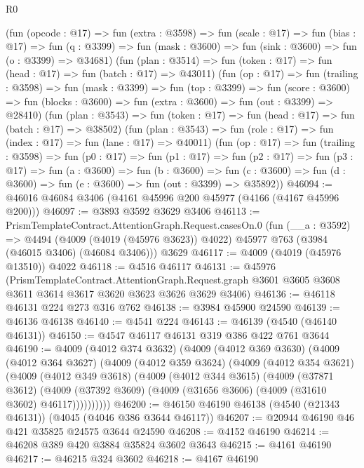 \begin{lexlean}{R0}
\begin{coremodule}
      (fun (opcode : @17) =>
      fun (extra : @3598) =>
      fun (scale : @17) =>
      fun (bias : @17) =>
      fun (q : @3399) => fun (mask : @3600) => fun (sink : @3600) => fun (o : @3399) => @34681)
      (fun (plan : @3514) => fun (token : @17) => fun (head : @17) => fun (batch : @17) => @43011)
      (fun (op : @17) =>
      fun (trailing : @3598) =>
      fun (mask : @3399) =>
      fun (top : @3399) =>
      fun (score : @3600) =>
      fun (blocks : @3600) => fun (extra : @3600) => fun (out : @3399) => @28410)
      (fun (plan : @3543) => fun (token : @17) => fun (head : @17) => fun (batch : @17) => @38502)
      (fun (plan : @3543) => fun (role : @17) => fun (index : @17) => fun (lane : @17) => @40011)
      (fun (op : @17) =>
      fun (trailing : @3598) =>
      fun (p0 : @17) =>
      fun (p1 : @17) =>
      fun (p2 : @17) =>
      fun (p3 : @17) =>
      fun (a : @3600) =>
      fun (b : @3600) =>
      fun (c : @3600) => fun (d : @3600) => fun (e : @3600) => fun (out : @3399) => @35892))
@46094 := @46016 @46084 @3406 (@4161 @45996 @200 @45977 (@4166 (@4167 @45996 @200)))
@46097 := @3893 @3592 @3629 @3406
@46113 := PrismTemplateContract.AttentionGraph.Request.casesOn.{0}
    (fun (__a : @3592) =>
    @4494 (@4009 (@4019 (@45976 @3623)) @4022) @45977 @763 (@3984 (@46015 @3406) (@46084 @3406)))
    @3629
@46117 := @4009 (@4019 (@45976 @13510)) @4022
@46118 := @4516 @46117
@46131 := @45976
    (PrismTemplateContract.AttentionGraph.Request.graph
      @3601
      @3605
      @3608
      @3611
      @3614
      @3617
      @3620
      @3623
      @3626
      @3629
      @3406)
@46136 := @46118 @46131 @224 @273 @316 @762
@46138 := @3984 @45900 @24590
@46139 := @46136 @46138
@46140 := @4541 @224
@46143 := @46139 (@4540 (@46140 @46131))
@46150 := @4547 @46117 @46131 @319 @386 @422 @761 @3644
@46190 := @4009
    (@4012 @374 @3632)
    (@4009
      (@4012 @369 @3630)
      (@4009
        (@4012 @364 @3627)
        (@4009
          (@4012 @359 @3624)
          (@4009
            (@4012 @354 @3621)
            (@4009
              (@4012 @349 @3618)
              (@4009
                (@4012 @344 @3615)
                (@4009
                  (@37871 @3612)
                  (@4009 (@37392 @3609) (@4009 (@31656 @3606) (@4009 (@31610 @3602) @46117))))))))))
@46200 := @46150 @46190 @46138 (@4540 (@21343 @46131)) (@4045 (@4046 @386 @3644 @46117))
@46207 := @20944 @46190 @46 @421 @35825 @24575 @3644 @24590
@46208 := @4152 @46190
@46214 := @46208 @389 @420 @3884 @35824 @3602 @3643
@46215 := @4161 @46190
@46217 := @46215 @324 @3602
@46218 := @4167 @46190

\end{coremodule}
\end{lexlean}
